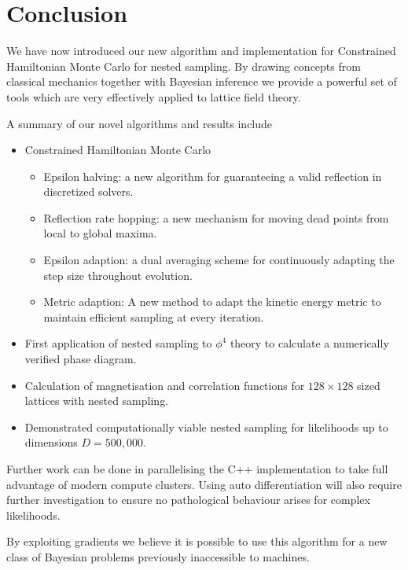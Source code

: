 \documentclass[11pt]{article}
\begin{document}
    \section{Conclusion}\label{sec:conclusion}
    We have now introduced our new algorithm and implementation for Constrained Hamiltonian Monte Carlo for nested sampling.
    By drawing concepts from classical mechanics together with Bayesian inference we provide a powerful
    set of tools which are very effectively applied to lattice field theory.

    A summary of our novel algorithms and results include
    \begin{itemize}
        \item Constrained Hamiltonian Monte Carlo
        \begin{itemize}
            \item Epsilon halving: a new algorithm for guaranteeing a valid reflection in discretized solvers.
            \item Reflection rate hopping: a new mechanism for moving dead points from local to global maxima.
            \item Epsilon adaption: a dual averaging scheme for continuously adapting the step size throughout evolution.
            \item Metric adaption: A new method to adapt the kinetic energy metric to maintain efficient sampling at every iteration.
        \end{itemize}
        \item First application of nested sampling to $\phi^4$ theory to calculate a numerically verified phase diagram.
        \item Calculation of magnetisation and correlation functions for $128 \times 128$ sized lattices with nested sampling.
        \item Demonstrated computationally viable nested sampling for likelihoods up to dimensions $D=500,000$.
    \end{itemize}


    Further work can be done in parallelising the C++ implementation to take full advantage of modern compute clusters.
    Using auto differentiation will also require further investigation to ensure no pathological behaviour arises for
    complex likelihoods.

    By exploiting gradients we believe it is possible to use this algorithm for a new class of
    Bayesian problems previously inaccessible to machines.
\end{document}
